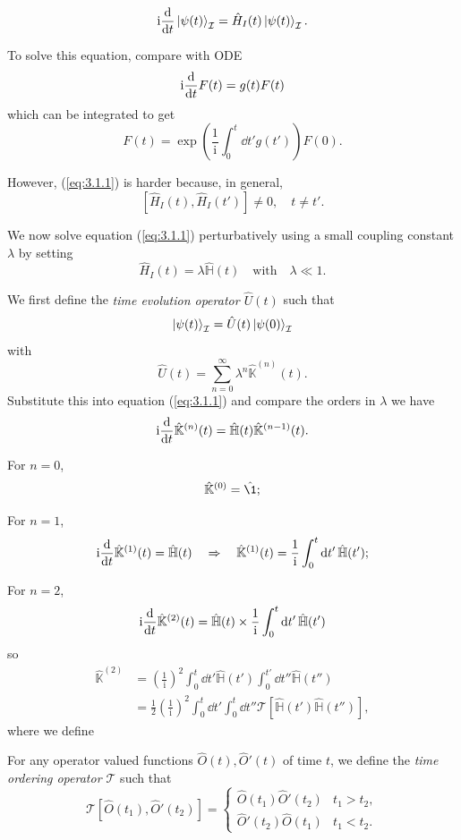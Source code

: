\documentclass[a4paper,11pt]{article}
\begin{document}
	\begin{equation}
		\mathrm{i} \dv{t} \ket{\psi(t)}_{\mathcal{I}} = \hat H_I(t) \ket{\psi(t)}_{\mathcal{I}}.
		\label{eq:3.1.1}
	\end{equation}
	
	To solve this equation, compare with ODE
	\[
		\mathrm{i} \dv{t}F(t) = g(t) F(t)
	\]
	which can be integrated to get
	\[
		F(t) = \exp(\frac{1}{\mathrm{i}}\int_{0}^{t}\dd{t'}g(t')) F(0).
	\]
	
	However, (\ref{eq:3.1.1}) is harder because, in general,
	\[
		[\hat H_I(t), \hat H_I (t')] \neq 0, \quad t \neq t'.
	\]
	
	We now solve equation (\ref{eq:3.1.1}) perturbatively using a small coupling constant $\lambda$ by setting
	\[
		\hat H_I(t) = \lambda \hat{\mathbb{H}}(t) \quad \text{with} \quad \lambda \ll 1.
	\]
	
	We first define the \emph{time evolution operator $\hat U(t)$} such that
	\[
		\ket{\psi(t)}_{\mathcal{I}} = \hat U(t) \ket{\psi(0)}_{\mathcal{I}}
	\]
	with
	\[
		\hat U(t) = \sum _{n=0}^{\infty} \lambda^n \hat{\mathbb{K}}^{(n)}(t).
	\]
	Substitute this into equation (\ref{eq:3.1.1}) and compare the orders in $\lambda$ we have
	\[
		\mathrm{i} \dv{t} \hat{\mathbb{K}}^{(n)} (t) = \hat{\mathbb{H}}(t) \hat{\mathbb{K}}^{(n-1)}(t).
	\]
	

	For $n=0$, \[
		\hat{\mathbb{K}}^{(0)} = \hat{\1};
	\]
	
	For $n=1$, \[
		\mathrm{i} \dv{t}\hat{\mathbb{K}}^{(1)}(t) = \hat{\mathbb{H}}(t) \quad \Rightarrow \quad \hat{\mathbb{K}}^{(1)}(t) = \frac{1}{\mathrm{i}} \int_{0}^{t} \dd{t'} \hat{\mathbb{H}}(t');
	\]
	
	For $n = 2$, \[
		\mathrm{i} \dv{t} \hat{\mathbb{K}}^{(2)}(t) = \hat{\mathbb{H}}(t) \times \frac{1}{\mathrm{i}} \int_{0}^{t}\dd{t'} \hat{\mathbb{H}}(t') 
	\]
	so \begin{align*}
		\hat{\mathbb{K}}^{(2)} & = \left( \frac{1}{\mathrm{i}} \right)^2 \int_{0}^{t} \dd{t'} \hat{\mathbb{H}}(t') \int_{0}^{t'} \dd{t''} \hat{\mathbb{H}}(t'')\\
		& = \frac{1}{2} \left( \frac{1}{\mathrm{i}} \right)^2 \int_{0}^{t} \dd{t'} \int_{0}^{t} \dd{t''} \mathcal{T} [\hat{\mathbb{H}}(t') \hat{\mathbb{H}}(t'')],
	\end{align*}
	where we define
	\begin{defi}
		For any operator valued functions $\hat O(t), \hat O'(t)$ of time $t$, we define the \emph{time ordering operator $\mathcal{T}$} such that
		\[
			\mathcal{T}[\hat O(t_1), \hat O'(t_2)] = \begin{cases}
				\hat O(t_1)\hat O'(t_2) & t_1 > t_2,\\
				\hat O'(t_2)\hat O(t_1) & t_1 < t_2.
			\end{cases}
		\]  
	\end{defi}
\end{document}
